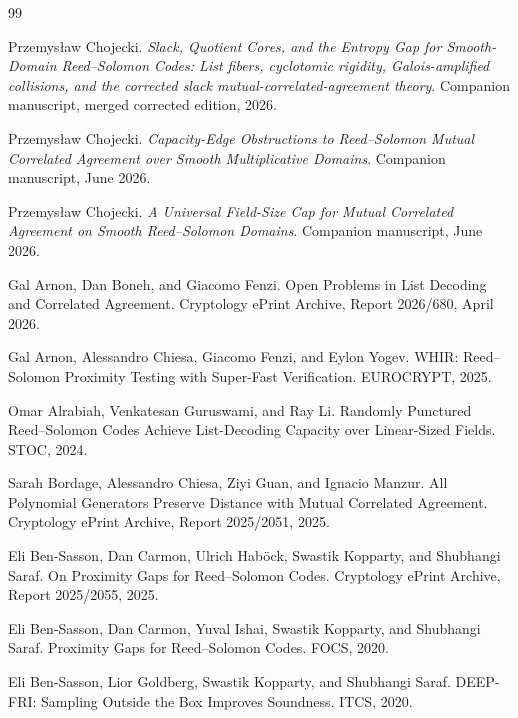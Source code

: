 \documentclass[11pt]{article}
\theoremstyle{definition}
\begin{document}
\begin{thebibliography}{99}

Przemys\l{}aw Chojecki.
\newblock \emph{Slack, Quotient Cores, and the Entropy Gap for Smooth-Domain Reed--Solomon Codes: List fibers, cyclotomic rigidity, Galois-amplified collisions, and the corrected slack mutual-correlated-agreement theory}.
\newblock Companion manuscript, merged corrected edition, 2026.

Przemys\l{}aw Chojecki.
\newblock \emph{Capacity-Edge Obstructions to Reed--Solomon Mutual Correlated Agreement over Smooth Multiplicative Domains}.
\newblock Companion manuscript, June 2026.

Przemys\l{}aw Chojecki.
\newblock \emph{A Universal Field-Size Cap for Mutual Correlated Agreement on Smooth Reed--Solomon Domains}.
\newblock Companion manuscript, June 2026.

Gal Arnon, Dan Boneh, and Giacomo Fenzi.
\newblock Open Problems in List Decoding and Correlated Agreement.
\newblock Cryptology ePrint Archive, Report 2026/680, April 2026.

Gal Arnon, Alessandro Chiesa, Giacomo Fenzi, and Eylon Yogev.
\newblock WHIR: Reed--Solomon Proximity Testing with Super-Fast Verification.
\newblock EUROCRYPT, 2025.

Omar Alrabiah, Venkatesan Guruswami, and Ray Li.
\newblock Randomly Punctured Reed--Solomon Codes Achieve List-Decoding Capacity over Linear-Sized Fields.
\newblock STOC, 2024.

Sarah Bordage, Alessandro Chiesa, Ziyi Guan, and Ignacio Manzur.
\newblock All Polynomial Generators Preserve Distance with Mutual Correlated Agreement.
\newblock Cryptology ePrint Archive, Report 2025/2051, 2025.

Eli Ben-Sasson, Dan Carmon, Ulrich Hab\"ock, Swastik Kopparty, and Shubhangi Saraf.
\newblock On Proximity Gaps for Reed--Solomon Codes.
\newblock Cryptology ePrint Archive, Report 2025/2055, 2025.

Eli Ben-Sasson, Dan Carmon, Yuval Ishai, Swastik Kopparty, and Shubhangi Saraf.
\newblock Proximity Gaps for Reed--Solomon Codes.
\newblock FOCS, 2020.

Eli Ben-Sasson, Lior Goldberg, Swastik Kopparty, and Shubhangi Saraf.
\newblock DEEP-FRI: Sampling Outside the Box Improves Soundness.
\newblock ITCS, 2020.


\end{thebibliography}
\end{document}
